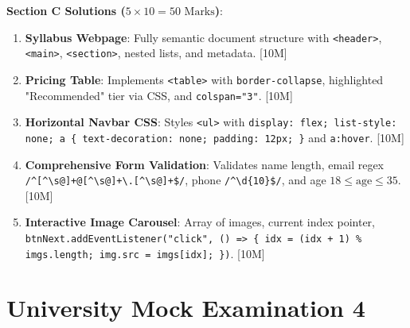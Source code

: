 \begin{solutionbox}
\medskip
\noindent\textbf{Section C Solutions ($5 \times 10 = 50\text{ Marks}$)}:
\begin{enumerate}[start=17]
    \item \textbf{Syllabus Webpage}: Fully semantic document structure with \texttt{<header>}, \texttt{<main>}, \texttt{<section>}, nested lists, and metadata. [10M]
    \item \textbf{Pricing Table}: Implements \texttt{<table>} with \texttt{border-collapse}, highlighted "Recommended" tier via CSS, and \texttt{colspan="3"}. [10M]
    \item \textbf{Horizontal Navbar CSS}: Styles \texttt{<ul>} with \texttt{display: flex; list-style: none; a \{ text-decoration: none; padding: 12px; \}} and \texttt{a:hover}. [10M]
    \item \textbf{Comprehensive Form Validation}: Validates name length, email regex \texttt{/\textasciicircum[\textasciicircum\textbackslash s@]+@[\textasciicircum\textbackslash s@]+\textbackslash.[\textasciicircum\textbackslash s@]+\$/}, phone \texttt{/\textasciicircum\textbackslash d\{10\}\$/}, and age $18 \le \text{age} \le 35$. [10M]
    \item \textbf{Interactive Image Carousel}: Array of images, current index pointer, \texttt{btnNext.addEventListener("click", () => \{ idx = (idx + 1) \% imgs.length; img.src = imgs[idx]; \})}. [10M]
\end{enumerate}
\end{solutionbox}

\section{University Mock Examination 4}

